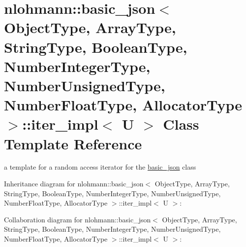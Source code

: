 \hypertarget{classnlohmann_1_1basic__json_1_1iter__impl}{}\section{nlohmann\+:\+:basic\+\_\+json$<$ Object\+Type, Array\+Type, String\+Type, Boolean\+Type, Number\+Integer\+Type, Number\+Unsigned\+Type, Number\+Float\+Type, Allocator\+Type $>$\+:\+:iter\+\_\+impl$<$ U $>$ Class Template Reference}
\label{classnlohmann_1_1basic__json_1_1iter__impl}


a template for a random access iterator for the \hyperlink{classnlohmann_1_1basic__json}{basic\+\_\+json} class  




Inheritance diagram for nlohmann\+:\+:basic\+\_\+json$<$ Object\+Type, Array\+Type, String\+Type, Boolean\+Type, Number\+Integer\+Type, Number\+Unsigned\+Type, Number\+Float\+Type, Allocator\+Type $>$\+:\+:iter\+\_\+impl$<$ U $>$\+:


Collaboration diagram for nlohmann\+:\+:basic\+\_\+json$<$ Object\+Type, Array\+Type, String\+Type, Boolean\+Type, Number\+Integer\+Type, Number\+Unsigned\+Type, Number\+Float\+Type, Allocator\+Type $>$\+:\+:iter\+\_\+impl$<$ U $>$\+:
